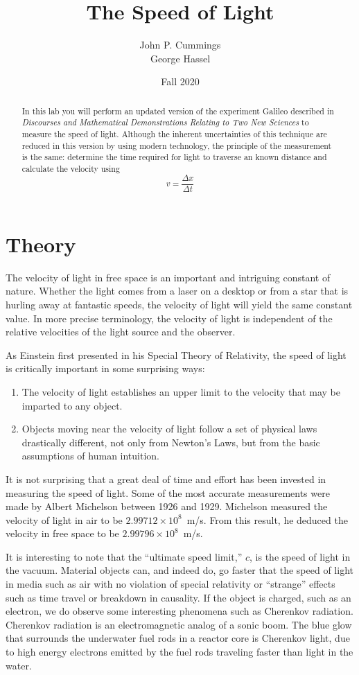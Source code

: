 \documentclass{article}
\title{The Speed of Light}
\author{John P. Cummings\\
George Hassel}
\date{Fall 2020}
\begin{document}
\maketitle

\begin{abstract}
In this lab you will perform an updated version of the experiment Galileo described in {\em Discourses and Mathematical Demonstrations Relating to Two New Sciences} to measure the speed of light.  Although the inherent uncertainties of this technique are reduced in this version by using modern technology, the principle of the measurement is the same:  determine the time required for light to traverse an known distance and calculate the velocity using 
\[
v=\frac{\Delta x}{\Delta t}
\]
\end{abstract}

\section{Theory}

The velocity of light in free space is an important and intriguing 
constant of nature. Whether the light comes from a laser on a desktop 
or from a star that is hurling away at fantastic speeds, the velocity of 
light will yield the same constant value. In more precise terminology, 
the velocity of light is independent of the relative velocities of the light 
source and the observer. 

As Einstein first presented in his Special Theory of Relativity, the 
speed of light is critically important in some surprising ways: 
\begin{enumerate}
\item The velocity of light establishes an upper limit to the velocity that 
may be imparted to any object.
\item Objects moving near the velocity of light follow a set of physical 
laws drastically different, not only from Newton's Laws, but from 
the basic assumptions of human intuition.
\end{enumerate}

It is not surprising that a great deal of time and effort has been invested 
in measuring the speed of light. Some of the most accurate 
measurements were made by Albert Michelson between 1926 and 
1929. Michelson measured the velocity of light in air to be $2.99712\times10^8$~m/s. From this result, he deduced the velocity in free space to be $2.99796 \times 10^8$~m/s.

It is interesting to note that the ``ultimate speed limit,'' $c$, is the speed of light in the vacuum.  Material objects can, and indeed do, go faster that the speed of light in media such as air with no violation of special relativity or ``strange'' effects such as time travel or breakdown in causality.  If the object is charged, such as an electron, we do observe some interesting phenomena such as Cherenkov radiation.
 Cherenkov radiation is an electromagnetic analog of a sonic boom.  The blue glow that surrounds the underwater fuel rods in a reactor core is Cherenkov light, due to high energy electrons emitted by the fuel rods traveling faster than light in the water.
\end{document}
